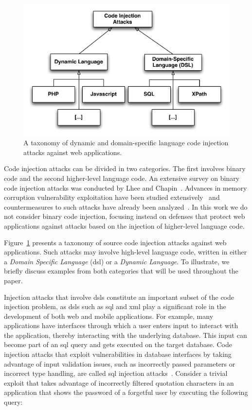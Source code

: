 \documentclass[10pt,journal,compsoc]{IEEEtran}
\begin{document}
\begin{figure}
\begin{center}
\leavevmode
\includegraphics[scale=0.55]{attack-tree-uml.pdf}
\end{center}
\caption{\label{fig:taxonomy}A taxonomy of dynamic and domain-specific
language code injection attacks against web applications.}
\end{figure}

Code injection attacks can be divided in two categories. The first
involves binary code and the second higher-level language code. An
extensive survey on binary code injection attacks was conducted by
Lhee and Chapin~\cite{LC03}. Advances in memory corruption vulnerability
exploitation have been studied extensively~\cite{PB04, SPWS13}
and countermeasures to such attacks
have already been analyzed~\cite{YJP12}\cite[Sec. 13.8]{DKZ12}.
In this work we do not consider binary code injection,
focusing instead on defenses
that protect web applications against attacks based on the
injection of higher-level language code.

Figure~\ref{fig:taxonomy} presents a taxonomy of source
code injection attacks against web applications.
Such attacks may involve high-level language code, written in either a
{\it Domain Specific Language} ({\sc dsl}) or a {\it Dynamic Language}.
To illustrate, we briefly discuss examples from both categories
that will be used throughout the paper.

Injection attacks that involve {\sc dsl}s constitute an important
subset of the code injection problem, as {\sc dsl}s such as
{\sc sql} and {\sc xml} play a significant role in the development of
both web and mobile applications. For example, many applications have
interfaces through which a user enters input to interact with the
application, thereby interacting with the underlying database. This
input can become part of an {\sc sql} query and gets executed on the
target database. Code injection attacks that exploit vulnerabilities
in database interfaces by taking advantage of input validation issues,
such as incorrectly passed parameters or incorrect type handling, are
called {\sc sql} injection attacks~\cite{CERT02,MS09,HVO06,SW06}.
Consider a trivial exploit that takes advantage of incorrectly
filtered quotation characters in an application that shows the
password of a forgetful user by executing the following
query:
\end{document}
